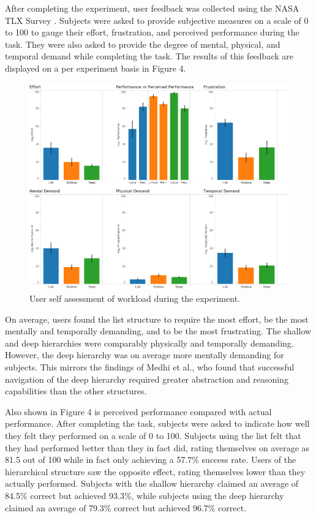 \documentclass{sigchi}
\begin{document}
After completing the experiment, user feedback was collected using the NASA TLX Survey \cite{NASA1986}. Subjects were asked to provide subjective measures on a scale of 0 to 100 to gauge their effort, frustration, and perceived performance during the task. They were also asked to provide the degree of mental, physical, and temporal demand while completing the task. The results of this feedback are displayed on a per experiment basis in Figure 4.

\begin{figure}[!h]
    \centering
    \includegraphics[width=0.9\columnwidth]{fig_nasaSummary}
    \caption{User self assessment of workload during the experiment.}
    \label{fig: Figure4}
\end{figure}

On average, users found the list structure to require the most effort, be the most mentally and temporally demanding, and to be the most frustrating. The shallow and deep hierarchies were comparably physically and temporally demanding. However, the deep hierarchy was on average more mentally demanding for subjects. This mirrors the findings of Medhi et al., who found that successful navigation of the deep hierarchy required greater abstraction and reasoning capabilities than the other structures.

Also shown in Figure 4 is perceived performance compared with actual performance. After completing the task, subjects were asked to indicate how well they felt they performed on a scale of 0 to 100. Subjects using the list felt that they had performed better than they in fact did, rating themselves on average as 81.5 out of 100 while in fact only achieving a 57.7\% success rate. Users of the hierarchical structure saw the opposite effect, rating themselves lower than they actually performed. Subjects with the shallow hierarchy claimed an average of 84.5\% correct but achieved 93.3\%, while subjects using the deep hierarchy claimed an average of 79.3\% correct but achieved 96.7\% correct.
\end{document}
